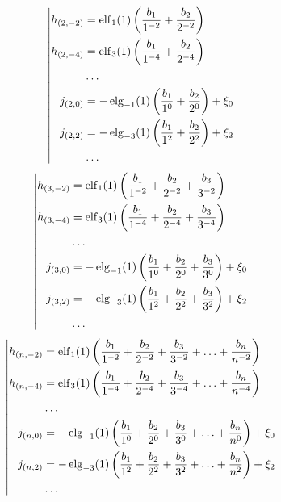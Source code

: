 \begin{equation*} \left| \begin{aligned}
h_{(2,-2)} &=
  \elf_1(1) \left(
  \frac{b_1}{1^{-2}}
+ \frac{b_2}{2^{-2}} \right) \\
%
h_{(2,-4)} &=
  \elf_3(1) \left(
  \frac{b_1}{1^{-4}}
+ \frac{b_2}{2^{-4}} \right) \\
%
&\ldots \\
%
j_{(2,0)} &=
- \elg_{-1}(1) \left(
  \frac{b_1}{1^0}
+ \frac{b_2}{2^0} \right)
+ \xi_0 \\
%
j_{(2,2)} &=
- \elg_{-3}(1) \left(
  \frac{b_1}{1^2}
+ \frac{b_2}{2^2} \right)
+ \xi_2 \\
%
&\ldots \\
\end{aligned} \right. \end{equation*}
%
\begin{equation*} \left| \begin{aligned}
%
h_{(3,-2)} &=
  \elf_1(1) \left(
  \frac{b_1}{1^{-2}}
+ \frac{b_2}{2^{-2}}
+ \frac{b_3}{3^{-2}} \right) \\
%
h_{(3,-4)} &=
  \elf_3(1) \left(
  \frac{b_1}{1^{-4}}
+ \frac{b_2}{2^{-4}}
+ \frac{b_3}{3^{-4}} \right) \\
%
&\ldots \\
%
j_{(3,0)} &=
- \elg_{-1}(1) \left(
  \frac{b_1}{1^0}
+ \frac{b_2}{2^0}
+ \frac{b_3}{3^0} \right)
+ \xi_0 \\
%
j_{(3,2)} &=
- \elg_{-3}(1) \left(
  \frac{b_1}{1^2}
+ \frac{b_2}{2^2}
+ \frac{b_3}{3^2} \right)
+ \xi_2 \\
%
&\ldots \\
\end{aligned} \right. \end{equation*}
%
\begin{equation*} \left| \begin{aligned}
h_{(n,-2)} &=
  \elf_1(1) \left(
  \frac{b_1}{1^{-2}}
+ \frac{b_2}{2^{-2}}
+ \frac{b_3}{3^{-2}}
+ \ldots
+ \frac{b_n}{n^{-2}} \right) \\
%
h_{(n,-4)} &=
  \elf_3(1) \left(
  \frac{b_1}{1^{-4}}
+ \frac{b_2}{2^{-4}}
+ \frac{b_3}{3^{-4}}
+ \ldots
+ \frac{b_n}{n^{-4}} \right) \\
%
&\ldots \\
%
j_{(n,0)} &=
- \elg_{-1}(1) \left(
  \frac{b_1}{1^0}
+ \frac{b_2}{2^0}
+ \frac{b_3}{3^0}
+ \ldots
+ \frac{b_n}{n^0} \right)
+ \xi_0 \\
%
j_{(n,2)} &=
- \elg_{-3}(1) \left(
  \frac{b_1}{1^2}
+ \frac{b_2}{2^2}
+ \frac{b_3}{3^2}
+ \ldots
+ \frac{b_n}{n^2} \right)
+ \xi_2 \\
%
&\ldots \\
\end{aligned} \right. \end{equation*}